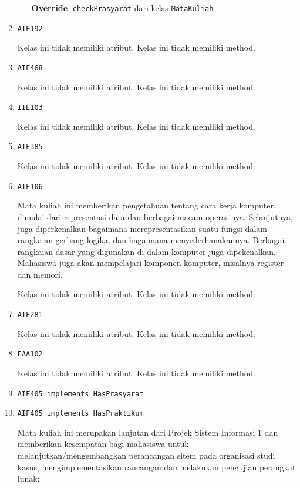 \documentclass{article}
\begin{document}
\begin{enumerate}
\begin{itemize}
\textbf{Override}: \texttt{checkPrasyarat} dari kelas \texttt{MataKuliah}

\end{itemize}
\item \texttt{AIF192}



Kelas ini tidak memiliki atribut. Kelas ini tidak memiliki method. \item \texttt{AIF468}



Kelas ini tidak memiliki atribut. Kelas ini tidak memiliki method. \item \texttt{IIE103}



Kelas ini tidak memiliki atribut. Kelas ini tidak memiliki method. \item \texttt{AIF385}



Kelas ini tidak memiliki atribut. Kelas ini tidak memiliki method. \item \texttt{AIF106}

Mata kuliah ini memberikan pengetahuan tentang cara kerja komputer, dimulai 
 dari representasi data dan berbagai macam operasinya. Selanjutnya, juga 
 diperkenalkan bagaimana merepresentasikan suatu fungsi dalam rangkaian 
 gerbang logika, dan bagaimana menyederhanakannya. Berbagai rangkaian dasar 
 yang digunakan di dalam komputer juga dipekenalkan. Mahasiswa juga akan 
 mempelajari komponen komputer, misalnya register dan memori.

Kelas ini tidak memiliki atribut. Kelas ini tidak memiliki method. \item \texttt{AIF281}



Kelas ini tidak memiliki atribut. Kelas ini tidak memiliki method. \item \texttt{EAA102}



Kelas ini tidak memiliki atribut. Kelas ini tidak memiliki method. \item \texttt{AIF405 implements HasPrasyarat}

\item \texttt{AIF405 implements HasPraktikum}

Mata kuliah ini merupakan lanjutan dari Projek Sistem Informasi 1 dan
 memberikan kesempatan bagi mahasiswa untuk melanjutkan/mengembangkan
 perancangan sitem pada organisasi studi kasus, mengimplementasikan rancangan
 dan melakukan pengujian perangkat lunak;


\end{enumerate}
\end{document}
